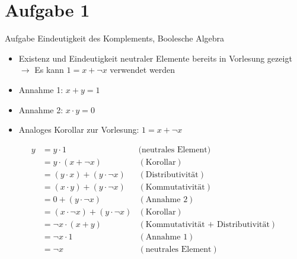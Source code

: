 
\section{Aufgabe 1}

\setcounter{exercise}{1}

\begin{frame}[allowframebreaks]{Aufgabe \thesection}{Eindeutigkeit des Komplements, Boolesche Algebra}
  \begin{solutionnoinc}
    \begin{itemize}
      \item Existenz und Eindeutigkeit neutraler Elemente bereits in Vorlesung gezeigt $\rightarrow$ Es kann $1 = x + \neg x$ verwendet werden
      \item \alert{Annahme 1:} $x + y = 1$
      \item \alert{Annahme 2:} $x · y = 0$
      \item \alert{Analoges Korollar zur Vorlesung:} $1 = x + \neg x$
    \end{itemize}
  \end{solutionnoinc}
  \begin{solution}
    \begin{align*}
      y&=y\cdot1&{({\text{neutrales~Element)}}}\\
      &{=y\cdot(x+\neg x)}&{(\text{Korollar})}\\
      &{=(y\cdot x)+(y\cdot \neg x)}&{(\text{Distributivität})}\\
      &{=(x\cdot y)+(y\cdot \neg x)}&{(\text{Kommutativität})}\\
      &{=0+(y\cdot \neg x)}&{(\text{Annahme 2})}\\
      &{=(x\cdot\neg x)+(y\cdot\neg x)}&{(\text{Korollar})}\\
      &{=\neg x\cdot (x+ y)}&{(\text{Kommutativität + Distributivität})}\\
      &{=\neg x\cdot 1}&{(\text{Annahme 1})}\\
      &=\neg x &(\text{neutrales~Element})
    \end{align*}
  \end{solution}
  \begin{solutionnoinc}
    \resizebox{\textwidth}{!}{
      \begin{minipage}[t]{8cm}
        \begin{align*}

\end{align*}
\end{minipage}}
\end{solutionnoinc}
\end{frame}
